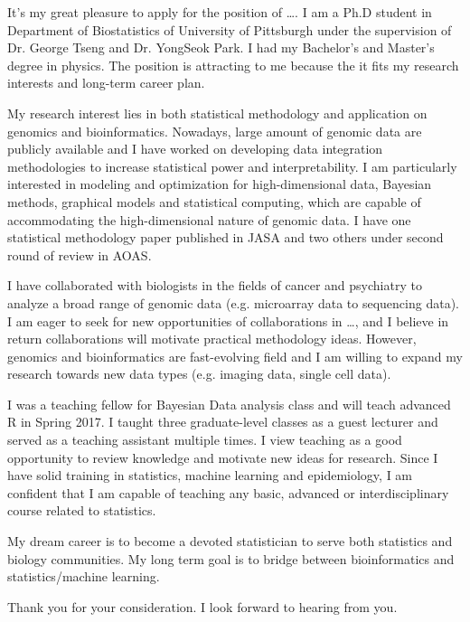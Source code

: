\documentclass[10pt,stdletter,orderfromtodate]{newlfm}
\begin{document}
\begin{newlfm}

It's my great pleasure to apply for the position of \ldots{}.
I am a Ph.D student in Department of Biostatistics of University of Pittsburgh
under the supervision of Dr. George Tseng and Dr. YongSeok Park.
I had my Bachelor's and Master's degree in physics.
The position is attracting to me because the it fits my research interests and long-term career plan.

My research interest lies in both statistical methodology and application on genomics and bioinformatics.
Nowadays, large amount of genomic data are publicly available and
I have worked on developing data integration methodologies to increase statistical power and interpretability. 
I am particularly interested in modeling and optimization for high-dimensional data, Bayesian methods, graphical models and statistical computing,
which are capable of accommodating the high-dimensional nature of genomic data.
I have one statistical methodology paper published in JASA and two others under second round of review in AOAS.

I have collaborated with biologists in the fields of cancer and psychiatry to analyze a broad range of genomic data (e.g. microarray data to sequencing data).
I am eager to seek for new opportunities of collaborations in \ldots{}, and I believe in return collaborations will motivate practical methodology ideas.
However, genomics and bioinformatics are fast-evolving field and 
I am willing to expand my research towards new data types (e.g. imaging data, single cell data).

I was a teaching fellow for Bayesian Data analysis class and will teach advanced R in Spring 2017.
I taught three graduate-level classes as a guest lecturer and served as a teaching assistant multiple times.
I view teaching as a good opportunity to review knowledge and motivate new ideas for research. 
Since I have solid training in statistics, machine learning and epidemiology, 
I am confident that I am capable of teaching any basic, advanced or interdisciplinary course related to statistics.

My dream career is to become a devoted statistician to serve both statistics and biology communities.
My long term goal is to bridge between bioinformatics and statistics/machine learning.


Thank you for your consideration.  
I look forward to hearing from you.

\end{newlfm}
\end{document}
